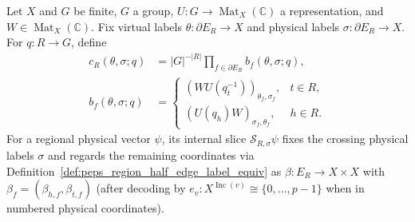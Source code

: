 \begin{definition}%
    \label{def:peps_open_sector_slice}
    \leanok
    Let $X$ and $G$ be finite, $G$ a group,
    $U:G\to\operatorname{Mat}_X(\mathbb C)$ a representation,
    and $W\in\operatorname{Mat}_X(\mathbb C)$.
    Fix virtual labels $\theta:\partial E_R\to X$ and physical
    labels $\sigma:\partial E_R\to X$.
    For $q:R\to G$, define
    \begin{align}
        c_R(\theta,\sigma;q)
         & =|G|^{-|R|}\prod_{f\in\partial E_R}b_f(\theta,\sigma;q),
        \label{eq:peps_open_sector_boundary_coefficient}            \\
        b_f(\theta,\sigma;q)
         & =\begin{cases}
                (WU(q_t^{-1}))_{\theta_f,\sigma_f}, & t\in R, \\
                (U(q_h)W)_{\sigma_f,\theta_f},      & h\in R.
            \end{cases}
        \label{eq:peps_open_sector_boundary_factors}
    \end{align}
    For a regional physical vector $\psi$, its internal slice
    $\mathcal S_{R,\sigma}\psi$ fixes the crossing physical labels $\sigma$ and
    regards the remaining coordinates via Definition~\ref{def:peps_region_half_edge_label_equiv}
    as $\beta:E_R\to X\times X$ with $\beta_f=(\beta_{h,f},\beta_{t,f})$ (after
    decoding by $e_v:X^{\operatorname{Inc}(v)}\cong\{0,\ldots,p-1\}$ when in
    numbered physical coordinates).
\end{definition}

